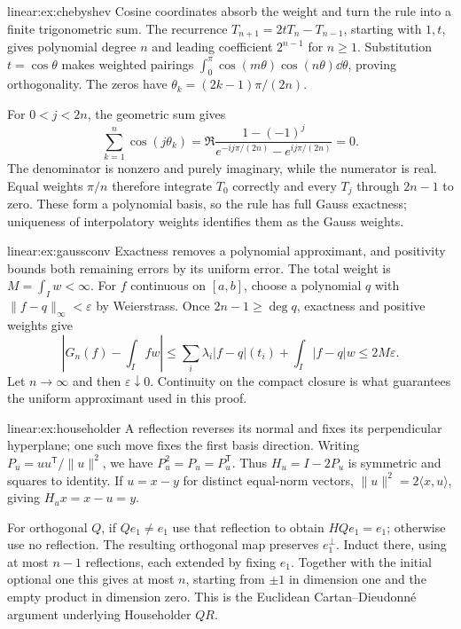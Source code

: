 \begin{solution}{linear:ex:chebyshev}
\idea Cosine coordinates absorb the weight and turn the rule into a finite trigonometric sum.
\writeup The recurrence $T_{n+1}=2tT_n-T_{n-1}$, starting with $1,t$, gives polynomial degree $n$ and leading coefficient $2^{n-1}$ for $n\ge1$. Substitution $t=\cos\theta$ makes weighted pairings $\int_0^\pi\cos(m\theta)\cos(n\theta)\dd\theta$, proving orthogonality. The zeros have $\theta_k=(2k-1)\pi/(2n)$.

For $0<j<2n$, the geometric sum gives
\[\sum_{k=1}^n\cos(j\theta_k)
 =\Re\frac{1-(-1)^j}{e^{-ij\pi/(2n)}-e^{ij\pi/(2n)}}=0.
\]
The denominator is nonzero and purely imaginary, while the numerator is real. Equal weights $\pi/n$ therefore integrate $T_0$ correctly and every $T_j$ through $2n-1$ to zero. These form a polynomial basis, so the rule has full Gauss exactness; uniqueness of interpolatory weights identifies them as the Gauss weights.
\end{solution}
\begin{solution}{linear:ex:gaussconv}
\idea Exactness removes a polynomial approximant, and positivity bounds both remaining errors by its uniform error.
\writeup The total weight is $M=\int_Iw<\infty$. For $f$ continuous on $[a,b]$, choose a polynomial $q$ with $\|f-q\|_\infty<\varepsilon$ by Weierstrass. Once $2n-1\ge\deg q$, exactness and positive weights give
\[|G_n(f)-\int_Ifw|\le\sum_i\lambda_i|f-q|(t_i)+\int_I|f-q|w\le2M\varepsilon.
\]
Let $n\to\infty$ and then $\varepsilon\downarrow0$. Continuity on the compact closure is what guarantees the uniform approximant used in this proof.
\end{solution}
\begin{solution}{linear:ex:householder}
\idea A reflection reverses its normal and fixes its perpendicular hyperplane; one such move fixes the first basis direction.
\writeup Writing $P_u=uu^{\mathsf T}/\|u\|^2$, we have $P_u^2=P_u=P_u^{\mathsf T}$. Thus $H_u=I-2P_u$ is symmetric and squares to identity. If $u=x-y$ for distinct equal-norm vectors, $\|u\|^2=2\langle x,u\rangle$, giving $H_ux=x-u=y$.

For orthogonal $Q$, if $Qe_1\ne e_1$ use that reflection to obtain $HQe_1=e_1$; otherwise use no reflection. The resulting orthogonal map preserves $e_1^\perp$. Induct there, using at most $n-1$ reflections, each extended by fixing $e_1$. Together with the initial optional one this gives at most $n$, starting from $\pm1$ in dimension one and the empty product in dimension zero. This is the Euclidean Cartan--Dieudonn\'e argument underlying Householder $QR$.
\end{solution}
